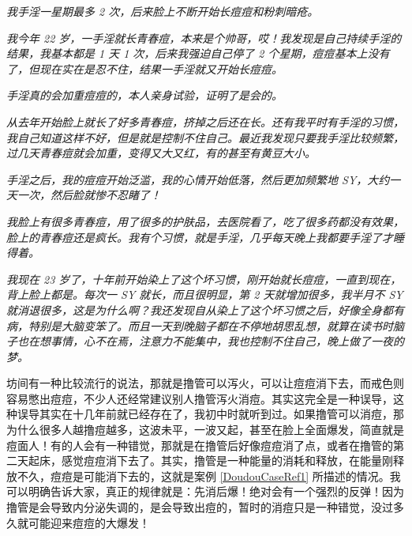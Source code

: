 \begin{case}[痘痘]\it
    我手淫一星期最多 2 次，后来脸上不断开始长痘痘和粉刺暗疮。
\end{case}

\begin{case}[痘痘]\it
    我今年 22 岁，一手淫就长青春痘，本来是个帅哥，哎！我发现是自己持续手淫的结果，我基本都是 1 天 1 次，后来我强迫自己停了 2 个星期，痘痘基本上没有了，但现在实在是忍不住，结果一手淫就又开始长痘痘。
\end{case}

\begin{case}[痘痘]\it
    手淫真的会加重痘痘的，本人亲身试验，证明了是会的。
\end{case}

\begin{case}[痘痘]\it
    从去年开始脸上就长了好多青春痘，挤掉之后还在长。还有我平时有手淫的习惯，我自己知道这样不好，但是就是控制不住自己。最近我发现只要我手淫比较频繁，过几天青春痘就会加重，变得又大又红，有的甚至有黄豆大小。
\end{case}

\begin{case}[痘痘]\it
    手淫之后，我的痘痘开始泛滥，我的心情开始低落，然后更加频繁地 SY，大约一天一次，然后脸就惨不忍睹了！
\end{case}

\begin{case}[痘痘]\it
    我脸上有很多青春痘，用了很多的护肤品，去医院看了，吃了很多药都没有效果，脸上的青春痘还是疯长。我有个习惯，就是手淫，几乎每天晚上我都要手淫了才睡得着。
\end{case}

\begin{case}[痘痘]\it
    我现在 23 岁了，十年前开始染上了这个坏习惯，刚开始就长痘痘，一直到现在，背上脸上都是。每次一 SY 就长，而且很明显，第 2 天就增加很多，我半月不 SY 就消退很多，这是为什么啊？我还发现自从染上了这个坏习惯之后，好像全身都有病，特别是大脑变笨了。而且一天到晚脑子都在不停地胡思乱想，就算在读书时脑子也在想事情，心不在焉，注意力不能集中，我也控制不住自己，晚上做了一夜的梦。
\end{case}

坊间有一种比较流行的说法，那就是撸管可以泻火，可以让痘痘消下去，而戒色则容易憋出痘痘，不少人还经常建议别人撸管泻火消痘。其实这完全是一种误导，这种误导其实在十几年前就已经存在了，我初中时就听到过。如果撸管可以消痘，那为什么很多人越撸痘越多，这波未平，一波又起，甚至在脸上全面爆发，简直就是痘面人！有的人会有一种错觉，那就是在撸管后好像痘痘消了点，或者在撸管的第二天起床，感觉痘痘消下去了。其实，撸管是一种能量的消耗和释放，在能量刚释放不久，痘痘是可能消下去的，这就是案例 \ref{DoudouCaseRef1} 所描述的情况。我可以明确告诉大家，真正的规律就是：先消后爆！绝对会有一个强烈的反弹！因为撸管是会导致内分泌失调的，是会导致出痘的，暂时的消痘只是一种错觉，没过多久就可能迎来痘痘的大爆发！

